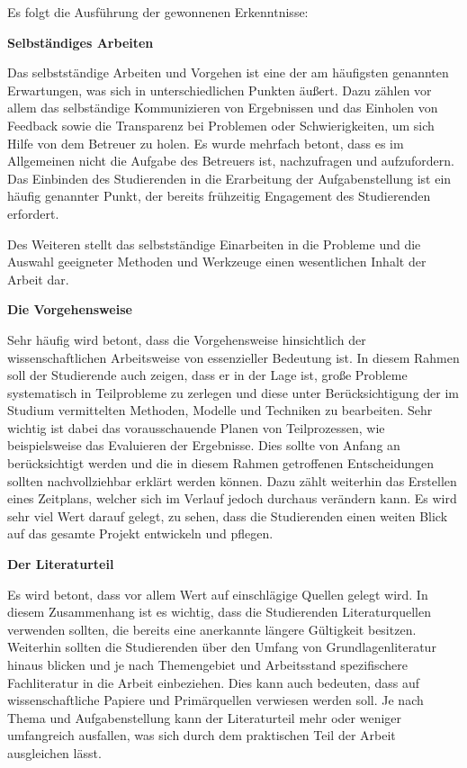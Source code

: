 \documentclass[bibliography=totoc,listof=totoc,BCOR=5mm,DIV=12,oneside]{scrbook}
\begin{document}
\par\medskip Es folgt die Ausführung der gewonnenen Erkenntnisse:

\par \bigskip \textbf{Selbständiges Arbeiten}
\par Das selbstständige Arbeiten und Vorgehen ist eine der am häufigsten genannten Erwartungen, was sich in unterschiedlichen Punkten äußert. Dazu zählen vor allem das selbständige Kommunizieren von Ergebnissen und das Einholen von Feedback sowie die Transparenz bei Problemen oder Schwierigkeiten, um sich Hilfe von dem Betreuer zu holen. Es wurde mehrfach betont, dass es im Allgemeinen nicht die Aufgabe des Betreuers ist, nachzufragen und aufzufordern. Das Einbinden des Studierenden in die Erarbeitung der Aufgabenstellung ist ein häufig genannter Punkt, der bereits frühzeitig Engagement des Studierenden erfordert.
\par Des Weiteren stellt das selbstständige Einarbeiten in die Probleme und die Auswahl geeigneter Methoden und Werkzeuge einen wesentlichen Inhalt der Arbeit dar.
\par \bigskip \textbf{Die Vorgehensweise}
\par Sehr häufig wird betont, dass die Vorgehensweise hinsichtlich der wissenschaftlichen Arbeitsweise von essenzieller Bedeutung ist. In diesem Rahmen soll der Studierende auch zeigen, dass er in der Lage ist, große Probleme systematisch in Teilprobleme zu zerlegen und diese unter Berücksichtigung der im Studium vermittelten Methoden, Modelle und Techniken zu bearbeiten. Sehr wichtig ist dabei das vorausschauende Planen von Teilprozessen, wie beispielsweise das Evaluieren der Ergebnisse. Dies sollte von Anfang an berücksichtigt werden und die in diesem Rahmen getroffenen Entscheidungen sollten nachvollziehbar erklärt werden können. Dazu zählt weiterhin das Erstellen eines Zeitplans, welcher sich im Verlauf jedoch durchaus verändern kann. Es wird sehr viel Wert darauf gelegt, zu sehen, dass die Studierenden einen weiten Blick auf das gesamte Projekt entwickeln und pflegen.
\par \bigskip \textbf{Der Literaturteil}
\par Es wird betont, dass vor allem Wert auf einschlägige Quellen gelegt wird. In diesem Zusammenhang ist es wichtig, dass die Studierenden Literaturquellen verwenden sollten, die bereits eine anerkannte längere Gültigkeit besitzen. Weiterhin sollten die Studierenden über den Umfang von Grundlagenliteratur hinaus blicken und je nach Themengebiet und Arbeitsstand spezifischere Fachliteratur in die Arbeit einbeziehen. Dies kann auch bedeuten, dass auf wissenschaftliche Papiere und Primärquellen verwiesen werden soll. Je nach Thema und Aufgabenstellung kann der Literaturteil mehr oder weniger umfangreich ausfallen, was sich durch dem praktischen Teil der Arbeit ausgleichen lässt.
\end{document}
